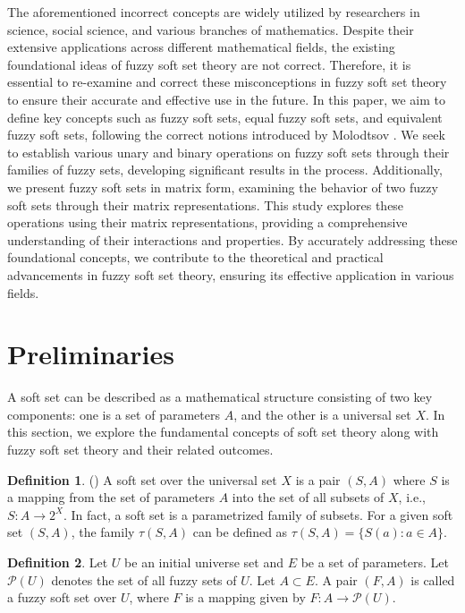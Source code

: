 \documentclass{article}
\theoremstyle{definition}
\newtheorem{definition}{Definition}[section]
\begin{document}
The aforementioned incorrect concepts are widely utilized by researchers in science, social science, and various branches of mathematics. Despite their extensive applications across different mathematical fields, the existing foundational ideas of fuzzy soft set theory are not correct. Therefore, it is essential to re-examine and correct these misconceptions in fuzzy soft set theory to ensure their accurate and effective use in the future. In this paper, we aim to define key concepts such as fuzzy soft sets, equal fuzzy soft sets, and equivalent fuzzy soft sets, following the correct notions introduced by Molodtsov \cite{1, 2, 3}. We seek to establish various unary and binary operations on fuzzy soft sets through their families of fuzzy sets, developing significant results in the process. Additionally, we present fuzzy soft sets in matrix form, examining the behavior of two fuzzy soft sets through their matrix representations. This study explores these operations using their matrix representations, providing a comprehensive understanding of their interactions and properties. By accurately addressing these foundational concepts, we contribute to the theoretical and practical advancements in fuzzy soft set theory, ensuring its effective application in various fields.\\

\section{Preliminaries}

A soft set can be described as a mathematical structure consisting of two key components: one is a set of parameters $A$, and the other is a universal set $X$. In this section, we explore the fundamental concepts of soft set theory along with fuzzy soft set theory and their related outcomes.\\

\begin{definition} (\cite{1, 3, 4})
A soft set over the universal set $X$ is a pair $(S,A)$ where $S$ is a mapping from the set of parameters $A$ into the set of all subsets of $X$, i.e., $S : A \to 2^X$. In fact, a soft set is a parametrized family of subsets. For a given soft set $(S,A)$, the family $\tau(S,A)$ can be defined as $\tau(S,A)=\{S(a): a \in A\}$. \\
    
\end{definition}

\begin{definition}\cite{7}
    Let $U$ be an initial universe set and $E$ be a set of parameters. Let $\mathcal{P}(U)$ denotes the set of all fuzzy sets of $U$. Let $A\subset E$. A pair $(F, A)$ is called a fuzzy soft set over $U$, where $F$ is a mapping given by $F:A\to \mathcal{P}(U)$.\\
\end{definition}
\end{document}

